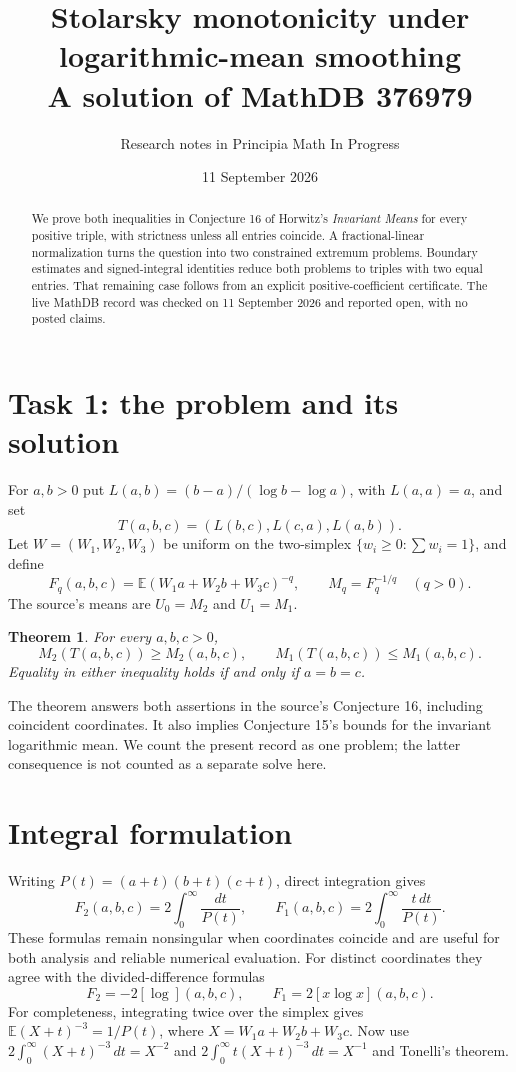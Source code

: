 \documentclass[11pt]{article}
\title{Stolarsky monotonicity under logarithmic-mean smoothing\\
\large A solution of MathDB 376979}
\author{Research notes in Principia Math In Progress}
\date{11 September 2026}
\newtheorem{theorem}{Theorem}
\begin{document}
\maketitle
\begin{abstract}
We prove both inequalities in Conjecture 16 of Horwitz's \emph{Invariant Means}
for every positive triple, with strictness unless all entries coincide.
A fractional-linear normalization turns the question into two constrained
extremum problems. Boundary estimates and signed-integral identities reduce
both problems to triples with two equal entries. That remaining case follows
from an explicit positive-coefficient certificate. The live MathDB record
was checked on 11 September 2026 and reported open, with no posted claims.
\end{abstract}

\section{Task 1: the problem and its solution}
For $a,b>0$ put $L(a,b)=(b-a)/(\log b-\log a)$, with $L(a,a)=a$, and set
\[
 T(a,b,c)=(L(b,c),L(c,a),L(a,b)).
\]
Let $W=(W_1,W_2,W_3)$ be uniform on the two-simplex
$\{w_i\geq0:\sum w_i=1\}$, and define
\[
 F_q(a,b,c)=\mathbb E(W_1a+W_2b+W_3c)^{-q},\qquad
 M_q=F_q^{-1/q}\quad(q>0).
\]
The source's means are $U_0=M_2$ and $U_1=M_1$.
\begin{theorem}\label{main}
For every $a,b,c>0$,
\[
 M_2(T(a,b,c))\geq M_2(a,b,c),\qquad
 M_1(T(a,b,c))\leq M_1(a,b,c).
\]
Equality in either inequality holds if and only if $a=b=c$.
\end{theorem}
The theorem answers both assertions in the source's Conjecture 16, including
coincident coordinates. It also implies Conjecture 15's bounds for the
invariant logarithmic mean. We count the present record as one problem;
the latter consequence is not counted as a separate solve here.

\section{Integral formulation}
Writing $P(t)=(a+t)(b+t)(c+t)$, direct integration gives
\[
 F_2(a,b,c)=2\int_0^\infty\frac{dt}{P(t)},\qquad
 F_1(a,b,c)=2\int_0^\infty\frac{t\,dt}{P(t)}.
\]
These formulas remain nonsingular when coordinates coincide and are useful
for both analysis and reliable numerical evaluation.
For distinct coordinates they agree with the divided-difference formulas
\[
 F_2=-2[\log](a,b,c),\qquad F_1=2[x\log x](a,b,c).
\]
For completeness, integrating twice over the simplex gives
$\mathbb E(X+t)^{-3}=1/P(t)$, where $X=W_1a+W_2b+W_3c$.
Now use
$2\int_0^\infty(X+t)^{-3}\,dt=X^{-2}$ and
$2\int_0^\infty t(X+t)^{-3}\,dt=X^{-1}$ and Tonelli's theorem.
\end{document}
